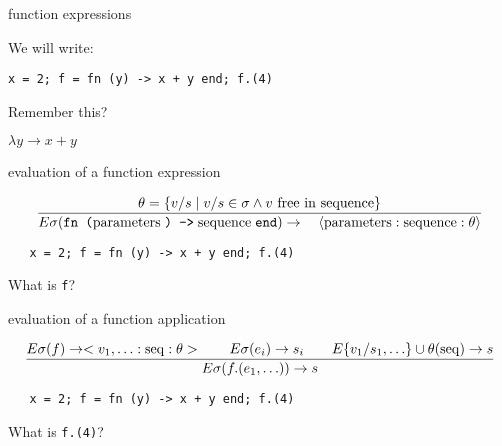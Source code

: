 \begin{frame}[fragile]{function expressions}

\pause\vspace{10pt}
We will write:

\pause\vspace{10pt}\hspace{60pt}\verb!x = 2; f = fn (y) -> x + y end; f.(4) !


\vspace{20pt}\pause
Remember this?

\pause\vspace{10pt}\hspace{60pt} $ \lambda y \rightarrow x + y $

\end{frame}


\begin{frame}[fragile]{evaluation of a function expression}

$$\frac{ \theta = \{ v/s \mid  v/s \in \sigma \wedge v {\rm\ free\  in\ sequence}\}}{
E\sigma(\texttt{fn (} {\rm parameters}\;  \texttt{) ->}\; {\rm sequence}\; \texttt{end} ) \rightarrow \quad \langle{\rm parameters}:{\rm sequence}:\theta\rangle}$$

\vspace{20pt}\pause
\begin{verbatim}
   x = 2; f = fn (y) -> x + y end; f.(4)
\end{verbatim}

\vspace{20pt}\hspace{40pt}What is {\tt f}?

\end{frame}


\begin{frame}[fragile]{evaluation of a function application}

$$\frac{E\sigma(f) \rightarrow <v_1, \ldots:{\rm seq}:\theta > \qquad E\sigma(e_i) \rightarrow s_i \qquad E\{v_1/s_1, \ldots\}\cup\theta({\rm seq}) \rightarrow s}{
E\sigma(f.(e_1, \ldots)) \rightarrow s}$$ 

\vspace{20pt}\pause
\begin{verbatim}
   x = 2; f = fn (y) -> x + y end; f.(4)
\end{verbatim}

\vspace{20pt}\hspace{40pt}What is {\tt f.(4)}?

\end{frame}
 
